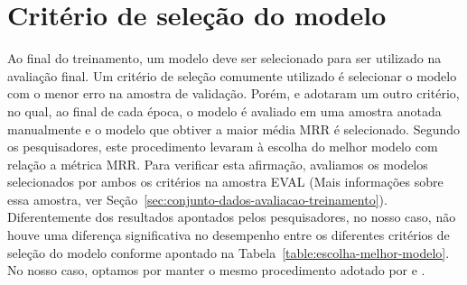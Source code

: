 \section{Critério de seleção do modelo}
\label{sec:ape-criterio-de-selecao-do-modelo-experimento}

Ao final do treinamento, um modelo deve ser selecionado para ser utilizado na avaliação final. Um critério de seleção comumente utilizado é selecionar o modelo com o menor erro na amostra de validação. Porém,  e  adotaram um outro critério, no qual, ao final de cada época, o modelo é avaliado em uma amostra anotada manualmente e o modelo que obtiver a maior média MRR é selecionado. Segundo os pesquisadores, este procedimento levaram à escolha do melhor modelo com relação a métrica MRR. Para verificar esta afirmação, avaliamos os modelos selecionados por ambos os critérios na amostra EVAL (Mais informações sobre essa amostra, ver Seção~\ref{sec:conjunto-dados-avaliacao-treinamento}). Diferentemente dos resultados apontados pelos pesquisadores, no nosso caso, não houve uma diferença significativa no desempenho entre os diferentes critérios de seleção do modelo conforme apontado na Tabela~\ref{table:escolha-melhor-modelo}. No nosso caso, optamos por manter o mesmo procedimento adotado por  e .


